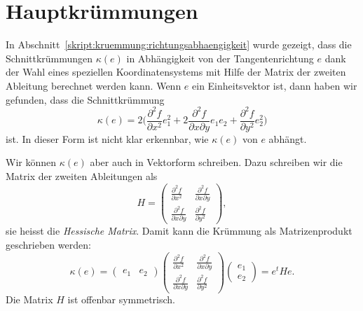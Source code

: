 %
%
%
\section{Hauptkrümmungen%
\label{skript:kurven:section:hauptkruemmungen}}
In Abschnitt~\eqref{skript:kruemmung:richtungsabhaengigkeit} wurde gezeigt,
dass die Schnittkrümmungen $\kappa(e)$ in Abhängigkeit von der
Tangentenrichtung $e$ dank der Wahl eines speziellen Koordinatensystems
mit Hilfe der Matrix der zweiten Ableitung berechnet werden kann.
Wenn $e$ ein Einheitsvektor ist, dann haben wir gefunden, dass die
Schnittkrümmung
\[
\kappa(e)
=
2\biggl(
\frac{\partial^2 f}{\partial x^2}
e_1^2
+
2
\frac{\partial^2 f}{\partial x\partial y}e_1e_2
+
\frac{\partial^2 f}{\partial y^2}e_2^2
\biggr)
\]
ist.
In dieser Form ist nicht klar erkennbar, wie $\kappa(e)$ von $e$ abhängt.

Wir können $\kappa(e)$ aber auch in Vektorform schreiben.
Dazu schreiben wir die Matrix der zweiten Ableitungen als
\[
H
=
\begin{pmatrix}
\displaystyle\frac{\partial^2 f}{\partial x^2}&
\displaystyle\frac{\partial^2 f}{\partial x\partial y}\\
\displaystyle\frac{\partial^2 f}{\partial x\partial y}&
\displaystyle\frac{\partial^2 f}{\partial y^2}
\end{pmatrix},
\]
sie heisst die {\em Hessische Matrix}.
Damit kann die Krümmung als Matrizenprodukt geschrieben werden:
\[
\kappa(e)
=
\begin{pmatrix}e_1&e_2\end{pmatrix}
\begin{pmatrix}
\displaystyle\frac{\partial^2 f}{\partial x^2}&
\displaystyle\frac{\partial^2 f}{\partial x\partial y}\\
\displaystyle\frac{\partial^2 f}{\partial x\partial y}&
\displaystyle\frac{\partial^2 f}{\partial y^2}
\end{pmatrix}
\begin{pmatrix}e_1\\e_2\end{pmatrix}
=
e^tHe.
\]
Die Matrix $H$ ist offenbar symmetrisch.

